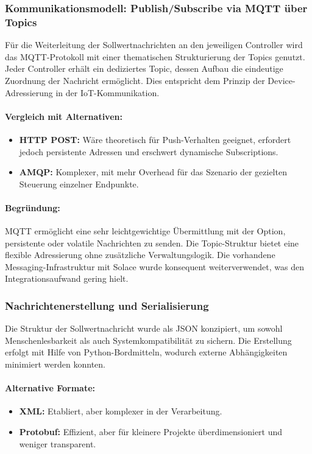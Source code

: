 \subsubsection*{Kommunikationsmodell: Publish/Subscribe via MQTT \"uber Topics}

F\"ur die Weiterleitung der Sollwertnachrichten an den jeweiligen Controller wird das MQTT-Protokoll mit einer thematischen Strukturierung der Topics genutzt. Jeder Controller erh\"alt ein dediziertes Topic, dessen Aufbau die eindeutige Zuordnung der Nachricht erm\"oglicht. Dies entspricht dem Prinzip der Device-Adressierung in der IoT-Kommunikation.

\paragraph*{Vergleich mit Alternativen:}

\begin{itemize}
  \item \textbf{HTTP POST:} W\"are theoretisch f\"ur Push-Verhalten geeignet, erfordert jedoch persistente Adressen und erschwert dynamische Subscriptions.
  \item \textbf{AMQP:} Komplexer, mit mehr Overhead f\"ur das Szenario der gezielten Steuerung einzelner Endpunkte.
\end{itemize}

\paragraph*{Begr\"undung:}

MQTT erm\"oglicht eine sehr leichtgewichtige \"Ubermittlung mit der Option, persistente oder volatile Nachrichten zu senden. Die Topic-Struktur bietet eine flexible Adressierung ohne zus\"atzliche Verwaltungslogik. Die vorhandene Messaging-Infrastruktur mit Solace wurde konsequent weiterverwendet, was den Integrationsaufwand gering hielt.

\subsubsection*{Nachrichtenerstellung und Serialisierung}

Die Struktur der Sollwertnachricht wurde als JSON konzipiert, um sowohl Menschenlesbarkeit als auch Systemkompatibilit\"at zu sichern. Die Erstellung erfolgt mit Hilfe von Python-Bordmitteln, wodurch externe Abh\"angigkeiten minimiert werden konnten.

\paragraph*{Alternative Formate:}
\begin{itemize}
  \item \textbf{XML:} Etabliert, aber komplexer in der Verarbeitung.
  \item \textbf{Protobuf:} Effizient, aber f\"ur kleinere Projekte \"uberdimensioniert und weniger transparent.
\end{itemize}


